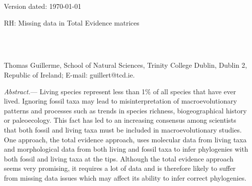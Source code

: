 \documentclass[12pt,letterpaper]{article}
\renewcommand{\subsubsection}[1]{%
\vspace{2ex}
\noindent
\textit{#1.}---}
\begin{document}
\begin{flushright}
Version dated: \today
\end{flushright}
\bigskip
\noindent RH: Missing data in Total Evidence matrices %

\bigskip
\medskip
\begin{center}

\bigskip


\\
\\
\end{center}
\medskip
{} Thomas Guillerme, School of Natural Sciences, Trinity College Dublin, Dublin 2, Republic of Ireland; E-mail: guillert@tcd.ie.\\
\vspace{1in}



\subsubsection{Abstract}
Living species represent less than 1\% of all species that have ever lived. Ignoring fossil taxa may lead to misinterpretation of macroevolutionary patterns and processes such as trends in species richness, biogeographical history or paleoecology.
This fact has led to an increasing consensus among scientists that both fossil and living taxa must be included in macroevolutionary studies.
One approach, the total evidence approach, uses molecular data from living taxa and morphological data from both living and fossil taxa to infer phylogenies with both fossil and living taxa at the tips.
Although the total evidence approach seems very promising, it requires a lot of data and is therefore likely to suffer from missing data issues which may affect its ability to infer correct phylogenies.
\end{document}
